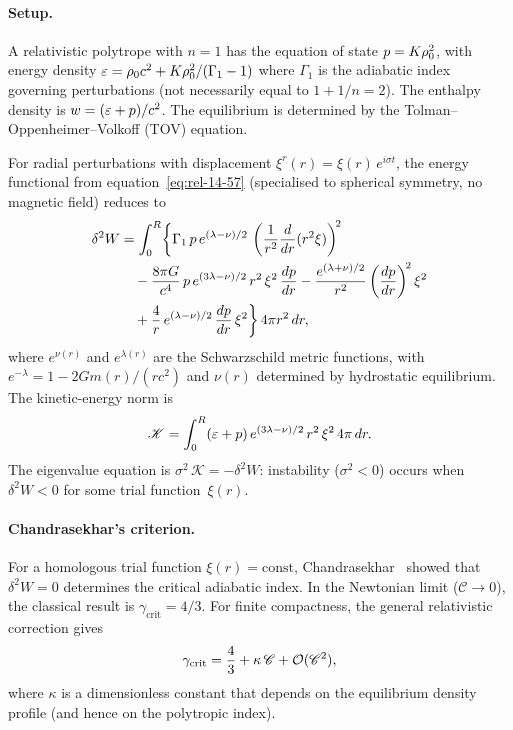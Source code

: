 \paragraph{Setup.}
A relativistic polytrope with $n = 1$ has the equation of state
$p = K\rho_0^{2}$, with energy density
$\varepsilon = \rho_0 c^{2} + K\rho_0^{2}/(\Gamma_{1}-1)$ where
$\Gamma_{1}$ is the adiabatic index governing perturbations (not
necessarily equal to $1 + 1/n = 2$).  The enthalpy density is
$w = (\varepsilon + p)/c^{2}$.  The equilibrium is determined by the
Tolman--Oppenheimer--Volkoff (TOV) equation.

For radial perturbations with displacement
$\xi^{r}(r) = \xi(r)\,e^{i\sigma t}$, the energy functional from
equation~\eqref{eq:rel-14-57} (specialised to spherical symmetry,
no magnetic field) reduces to
\begin{align}
\delta^{2}W
  &= \int_{0}^{R}\biggl\{
    \Gamma_{1}\,p\,e^{(\lambda-\nu)/2}\,
    \left(\frac{1}{r^{2}}\frac{d}{dr}(r^{2}\xi)\right)^{\!2}
\notag\\
  &\quad
    - \frac{8\pi G}{c^{4}}\,p\,e^{(3\lambda-\nu)/2}\,
    r^{2}\,\xi^{2}\,\frac{dp}{dr}
    - \frac{e^{(\lambda+\nu)/2}}{r^{2}}
    \left(\frac{dp}{dr}\right)^{\!2}\xi^{2}
\notag\\
  &\quad
    + \frac{4}{r}\,e^{(\lambda-\nu)/2}\,\frac{dp}{dr}\,\xi^{2}
  \biggr\}\,4\pi r^{2}\,dr,
\label{eq:rel-14-d2W-radial}
\end{align}
where $e^{\nu(r)}$ and $e^{\lambda(r)}$ are the Schwarzschild metric
functions, with $e^{-\lambda} = 1 - 2Gm(r)/(rc^{2})$ and $\nu(r)$
determined by hydrostatic equilibrium.  The kinetic-energy norm is
\begin{equation}
\mathscr{K} = \int_{0}^{R}
  (\varepsilon + p)\,e^{(3\lambda-\nu)/2}\,r^{2}\,\xi^{2}\,
  4\pi\,dr.
\label{eq:rel-14-K-norm}
\end{equation}
The eigenvalue equation is $\sigma^{2}\,\mathscr{K} = -\delta^{2}W$:
instability ($\sigma^{2} < 0$) occurs when $\delta^{2}W < 0$ for
some trial function~$\xi(r)$.

\paragraph{Chandrasekhar's criterion.}
For a homologous trial function $\xi(r) = \mathrm{const}$,
Chandrasekhar~\citep{Chandrasekhar1964} showed that
$\delta^{2}W = 0$ determines the critical adiabatic index.  In the
Newtonian limit ($\mathscr{C} \to 0$), the classical result is
$\gamma_{\mathrm{crit}} = 4/3$.  For finite compactness, the general
relativistic correction gives
\begin{equation}
\gamma_{\mathrm{crit}}
  = \frac{4}{3} + \kappa\,\mathscr{C} + \mathcal{O}(\mathscr{C}^{2}),
\label{eq:rel-14-gamma-crit-expansion}
\end{equation}
where $\kappa$ is a dimensionless constant that depends on the
equilibrium density profile (and hence on the polytropic index).

